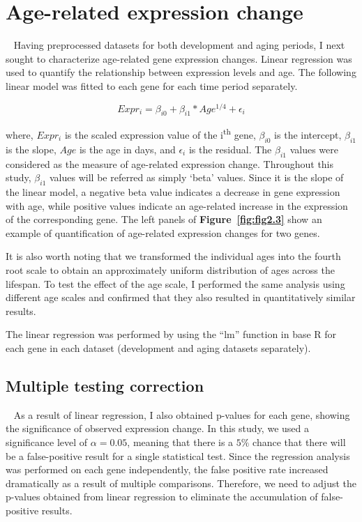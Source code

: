 \section{Age-related expression change}~\label{sec:exp-change}
Having preprocessed datasets for both development and aging periods, I next sought to characterize age-related gene expression changes. 
Linear regression was used to quantify the relationship between expression levels and age. 
The following linear model was fitted to each gene for each time period separately.

\begin{equation}
    Expr_i = \beta_{i0} + \beta_{i1} * Age^{1/4} + \epsilon_i
    \label{eq:exp_change}
\end{equation}

where, $Expr_i$ is the scaled expression value of the i\textsuperscript{th} gene, $\beta_{i0}$ is the intercept, $\beta_{i1}$ is the slope, $Age$ is the age in days, and $\epsilon_i$ is the residual.
The $\beta_{i1}$ values were considered as the measure of age-related expression change. Throughout this study, $\beta_{i1}$ values will be referred as simply `beta' values.
Since it is the slope of the linear model, a negative beta value indicates a decrease in gene expression with age, while positive values indicate an age-related increase in the expression of the corresponding gene. 
The left panels of \textbf{Figure~\ref{fig:fig2.3}} show an example of quantification of age-related expression changes for two genes.

It is also worth noting that we transformed the individual ages into the fourth root scale to obtain an approximately uniform distribution of ages across the lifespan.
To test the effect of the age scale, I performed the same analysis using different age scales and confirmed that they also resulted in quantitatively similar results.

The linear regression was performed by using the ``lm'' function in base R for each gene in each dataset (development and aging datasets separately).

\subsection{Multiple testing correction}~\label{subsec:p.adjust}
As a result of linear regression, I also obtained p-values for each gene, showing the significance of observed expression change.
In this study, we used a significance level of $\alpha = 0.05$, meaning that there is a $5\%$ chance that there will be a false-positive result for a single statistical test.
Since the regression analysis was performed on each gene independently, the false positive rate increased dramatically as a result of multiple comparisons.
Therefore, we need to adjust the p-values obtained from linear regression to eliminate the accumulation of false-positive results.

